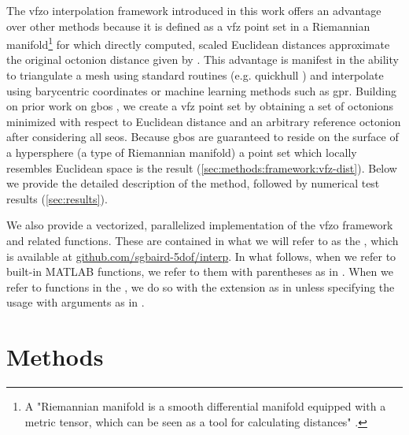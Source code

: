 \documentclass[final,twocolumn,12pt]{elsarticle}
\begin{document}
The \gls{vfzo} interpolation framework introduced in this work offers an advantage over other methods because it is defined as a \gls{vfz} point set in a Riemannian manifold\footnote{A "Riemannian manifold is a smooth differential manifold equipped with a metric tensor, which can be seen as a tool for calculating distances" \cite{morawiecDistancesGrainInterfaces2019}. } for which directly computed, scaled Euclidean distances approximate the original octonion distance given by \citet{francisGeodesicOctonionMetric2019}. This advantage is manifest in the ability to triangulate a mesh using standard routines (e.g. quickhull \cite{barberQuickhullAlgorithmConvex1996}) and interpolate using barycentric coordinates or machine learning methods such as \gls{gpr}. Building on prior work on \glspl{gbo} \cite{francisGeodesicOctonionMetric2019,chesserLearningGrainBoundary2020}, we create a \gls{vfz} point set by obtaining a set of octonions minimized with respect to Euclidean distance and an arbitrary reference octonion after considering all \glspl{seo}. Because \glspl{gbo} are guaranteed to reside on the surface of a hypersphere \cite{francisGeodesicOctonionMetric2019} (a type of Riemannian manifold) a point set which locally resembles Euclidean space is the result (\cref{sec:methods:framework:vfz-dist}). Below we provide the detailed description of the method, followed by numerical test results (\cref{sec:results}).

We also provide a vectorized, parallelized implementation of the \gls{vfzo} framework and related functions. These are contained in what we will refer to as the \vfzorepo{}, which is available at \url{github.com/sgbaird-5dof/interp}. In what follows, when we refer to built-in MATLAB functions, we refer to them with parentheses as in . When we refer to functions in the \vfzorepo{}, we do so with the  extension as in  unless specifying the usage with arguments as in .

\section{Methods} \label{sec:methods}
\end{document}

